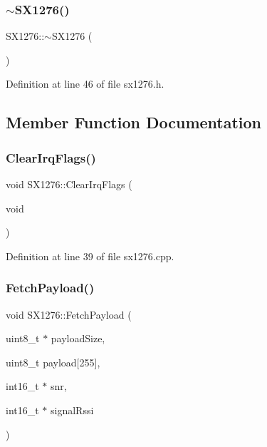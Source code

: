 \subsubsection{\texorpdfstring{$\sim$\+S\+X1276()}{~SX1276()}}
{\footnotesize\ttfamily S\+X1276\+::$\sim$\+S\+X1276 (\begin{DoxyParamCaption}{ }\end{DoxyParamCaption})\hspace{0.3cm}{\ttfamily [inline]}}



Definition at line 46 of file sx1276.\+h.



\subsection{Member Function Documentation}
\mbox{\label{class_s_x1276_a7afd0cc488888310b8821eaa8000f1bb}} 
\subsubsection{\texorpdfstring{Clear\+Irq\+Flags()}{ClearIrqFlags()}}
{\footnotesize\ttfamily void S\+X1276\+::\+Clear\+Irq\+Flags (\begin{DoxyParamCaption}\item[{void}]{ }\end{DoxyParamCaption})}



Definition at line 39 of file sx1276.\+cpp.

\mbox{\label{class_s_x1276_ade5b7c1ac84e1f18e4d2487f12763cfa}} 
\subsubsection{\texorpdfstring{Fetch\+Payload()}{FetchPayload()}}
{\footnotesize\ttfamily void S\+X1276\+::\+Fetch\+Payload (\begin{DoxyParamCaption}\item[{uint8\+\_\+t $\ast$}]{payload\+Size,  }\item[{uint8\+\_\+t}]{payload\mbox{[}255\mbox{]},  }\item[{int16\+\_\+t $\ast$}]{snr,  }\item[{int16\+\_\+t $\ast$}]{signal\+Rssi }\end{DoxyParamCaption})}




